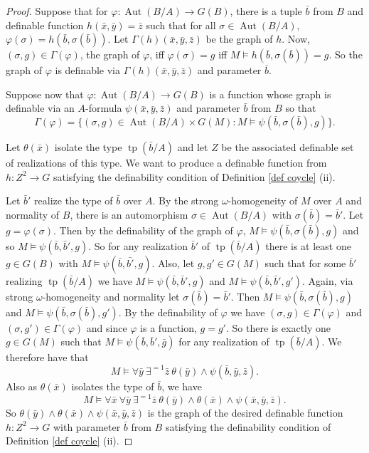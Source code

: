 \documentclass{article}
\theoremstyle{problemstyle}
\DeclareMathOperator{\tp}{tp} %
\DeclareMathOperator{\aut}{Aut} %
\begin{document}
\begin{proof}
    Suppose that for $\varphi:\aut(B/A) \to G(B)$, there is a tuple $\bar{b}$ from $B$ and definable function $h(\bar{x},\bar{y}) = \bar{z}$ such that for all $\sigma \in \aut(B/A)$, $\varphi(\sigma) = h(\bar{b},\sigma(\bar{b}))$. Let $\Gamma(h)(\bar{x},\bar{y},\bar{z})$ be the graph of $h$. Now, $(\sigma,g) \in \Gamma(\varphi)$, the graph of $\varphi$, iff $\varphi(\sigma)  = g$ iff $ M \models h(\bar{b},\sigma(\bar{b})) = g$. So the graph of $\varphi$ is definable via $\Gamma(h)(\bar{x},\bar{y},\bar{z})$ and parameter $\bar{b}$.

    Suppose now that $\varphi:\aut(B/A) \to G(B)$ is a function whose graph is definable via an $A$-formula $\psi(\bar{x},\bar{y}, \bar{z})$ and parameter $\bar{b}$ from $B$ so that $$\Gamma(\varphi) = \{(\sigma,g) \in \aut(B/A) \times G(M) :  M \models \psi(\bar{b},\sigma(\bar{b}),g)\}.$$ 
    
    Let $\theta(\bar{x})$ isolate the type $\tp(\bar{b}/A)$ and let $Z$ be the associated definable set of realizations of this type. We want to produce a definable function from $h:Z^2 \to G$ satisfying the definability condition of Definition \ref{def coycle} (ii). 
    
    Let $\bar{b}'$ realize the type of $\bar{b}$ over $A$. By the strong $\omega$-homogeneity of $M$ over $A$ and normality of $B$, there is an automorphism $\sigma \in \aut(B/A)$ with $\sigma(\bar{b}) = \bar{b}'$. Let $g = \varphi(\sigma)$. Then by the definability of the graph of $\varphi$,  $M \models \psi(\bar{b},\sigma(\bar{b}),g)$ and so $M \models \psi(\bar{b},\bar{b}',g)$. So for any realization $\bar{b}'$ of $\tp(\bar{b}/A)$ there is at least one $g \in G(B)$ with $M \models \psi(\bar{b},\bar{b'},g)$. Also, let $g,g' \in G(M)$ such that for some $\bar{b}'$ realizing $\tp(\bar{b}/A)$ we have $M \models \psi(\bar{b},\bar{b}',g)$ and $M \models \psi(\bar{b},\bar{b}',g')$. Again, via strong $\omega$-homogeneity and normality let $\sigma(\bar{b}) = \bar{b}'$. Then $M \models \psi(\bar{b},\sigma(\bar{b}),g)$ and $M \models \psi(\bar{b},\sigma(\bar{b}),g')$. By the definability of $\varphi$ we have $(\sigma,g) \in \Gamma(\varphi)$ and $(\sigma,g') \in \Gamma(\varphi)$ and since $\varphi$ is a function, $g = g'$. So there is exactly one $g \in G(M)$ such that $M \models \psi(\bar{b},\bar{b}',\bar{g})$ for any realization of $\tp(\bar{b}/A)$. We therefore have that $$M \models \forall \bar{y} \  \exists^{=1}  \bar{z} \ \theta(\bar{y})\wedge \psi(\bar{b},\bar{y},\bar{z}).$$ Also as $\theta(\bar{x})$ isolates the type of $\bar{b}$, we have $$M \models \forall \bar{x}  \ \forall \bar{y}  \ \exists^{=1} \bar{z}  \ \theta(\bar{y})\wedge\theta(\bar{x}) \wedge \psi(\bar{x},\bar{y},\bar{z}).$$ So $\theta(\bar{y})\wedge\theta(\bar{x}) \wedge \psi(\bar{x},\bar{y},\bar{z})$ is the graph of the desired definable function $h:Z^2 \to G$ with parameter $\bar{b}$ from $B$ satisfying the definability condition of Definition \ref{def coycle} (ii).
\end{proof}
\end{document}
